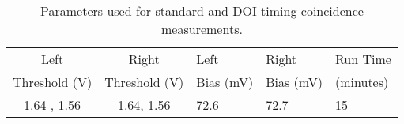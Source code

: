 \begin{table}
\caption{\label{tab:optimumparam} Parameters used for standard and DOI timing coincidence measurements.} 
\begin{tabular}{cclll}
\hline
Left &  Right & Left & Right & Run Time\\
Threshold (V) & Threshold (V)& Bias (mV) & Bias (mV) & (minutes)\\
\hline
1.64 , 1.56 &  1.64, 1.56 &  72.6 &  72.7 & 15\\
\hline
\end{tabular}
\end{table}

